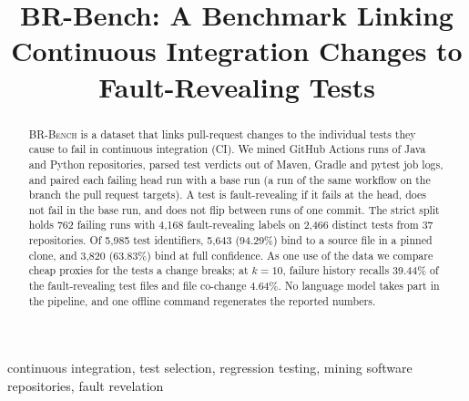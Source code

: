 \documentclass[10pt,conference]{IEEEtran}
\begin{document}
\title{BR-Bench: A Benchmark Linking Continuous Integration Changes to Fault-Revealing Tests}

\author{
}

\maketitle

\begin{abstract}
\textsc{BR-Bench} is a dataset that links pull-request changes to the individual tests they cause to fail in continuous integration (CI). We mined GitHub Actions runs of Java and Python repositories, parsed test verdicts out of Maven, Gradle and pytest job logs, and paired each failing head run with a base run (a run of the same workflow on the branch the pull request targets). A test is fault-revealing if it fails at the head, does not fail in the base run, and does not flip between runs of one commit. The strict split holds 762 failing runs with 4,168 fault-revealing labels on 2,466 distinct tests from 37 repositories. Of 5,985 test identifiers, 5,643 (94.29\%) bind to a source file in a pinned clone, and 3,820 (63.83\%) bind at full confidence. As one use of the data we compare cheap proxies for the tests a change breaks; at $k=10$, failure history recalls 39.44\% of the fault-revealing test files and file co-change 4.64\%. No language model takes part in the pipeline, and one offline command regenerates the reported numbers.
\end{abstract}

\begin{IEEEkeywords}
continuous integration, test selection, regression testing, mining software repositories, fault revelation
\end{IEEEkeywords}
\end{document}
